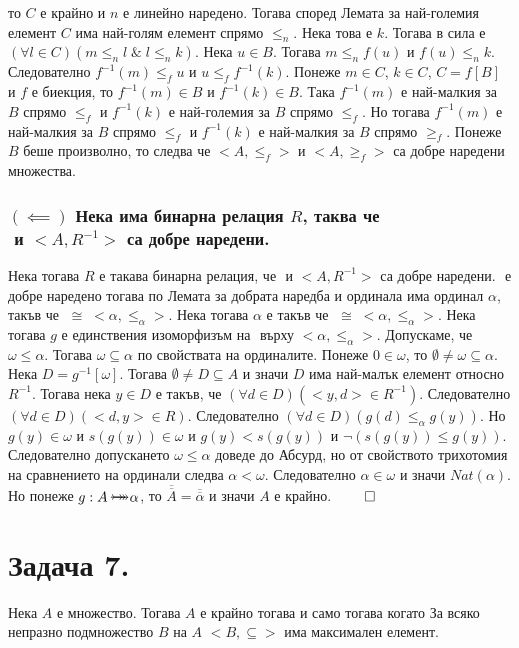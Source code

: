 \documentclass[12pt]{article}
\newcommand{\bijection}[0]{\mathbin{\mathlarger{\mathlarger{\rightarrowtail}} \hspace{-14pt} \mathlarger{\mathlarger{\twoheadrightarrow}}}}
\begin{document}
то \(C\) е крайно и \(n\) е линейно наредено.
Тогава според Лемата за най-големия елемент \(C\) има най-голям елемент спрямо \(\leq_n\).
Нека това е \(k\).
Тогава в сила е \((\forall l \in C)(m \leq_n l \; \& \; l \leq_n k)\).
Нека \(u \in B\). Тогава \(m \leq_n f(u)\) и \(f(u) \leq_n k\).
Следователно \(f^{-1}(m) \leq_f u\) и \(u \leq_f f^{-1}(k)\).
Понеже \(m \in C\), \(k \in C\), \(C = f[B]\) и \(f\) е биекция,
то \(f^{-1}(m) \in B\) и \(f^{-1}(k) \in B\).
Така \(f^{-1}(m)\) е най-малкия за \(B\) спрямо \(\leq_f\)
и \(f^{-1}(k)\) е най-големия за \(B\) спрямо \(\leq_f\).
Но тогава \(f^{-1}(m)\) е най-малкия за \(B\) спрямо \(\leq_f\)
и \(f^{-1}(k)\) е най-малкия за \(B\) спрямо \(\geq_f\).
Понеже \(B\) беше произволно, то следва че
\(<A, \leq_f>\) и \(<A, \geq_f>\) са добре наредени множества.

\subsubsection*{\((\impliedby)\) Нека има бинарна релация \(R\), таква че \\ \(<A, R>\) и \(<A, R^{-1}>\) са добре наредени.}
Нека тогава \(R\) е такава бинарна релация, че \(<A, R>\) и \(<A, R^{-1}>\) са добре наредени. \(<A, R>\) е добре наредено тогава по Лемата за добрата наредба и ординала
има ординал \(\alpha\), такъв че \(<A, R> \; \cong \; <\alpha, \leq_\alpha>\).
Нека тогава \(\alpha\) е такъв че \(<A, R> \; \cong \; <\alpha, \leq_\alpha>\).
Нека тогава \(g\) е единствения изоморфизъм на \(<A, R>\) върху \(<\alpha, \leq_\alpha>\).
Допускаме, че \(\omega \leq \alpha\).
Тогава \(\omega \subseteq \alpha\) по свойствата на ординалите.
Понеже \(0 \in \omega\), то \(\emptyset \neq \omega \subseteq \alpha\).
Нека \(D = g^{-1}[\omega]\). Тогава \(\emptyset \neq D \subseteq A\) и значи
\(D\) има най-малък елемент относно \(R^{-1}\).
Тогава нека \(y \in D\) е такъв, че \((\forall d \in D)(<y, d> \in R^{-1})\).
Следователно \((\forall d \in D)(<d, y> \in R)\).
Следователно \((\forall d \in D)(g(d) \leq_\alpha g(y))\).
Но \(g(y) \in \omega\) и \(s(g(y)) \in \omega\) и \(g(y) < s(g(y))\) и \(\lnot(s(g(y)) \leq g(y))\).
Следователно допускането \(\omega \leq \alpha\) доведе до Абсурд,
но от свойството трихотомия на сравнението на ординали следва \(\alpha < \omega\).
Следователно \(\alpha \in \omega\) и значи \(Nat(\alpha)\).
Но понеже \(g : A \bijection \alpha\), то \(\overline{\overline{A}} = \overline{\overline{\alpha}}\) и значи \(A\) е крайно. \(\qed\)

\section*{Задача 7.}
Нека \(A\) е множество. Тогава \(A\) е крайно тогава и само тогава когато
За всяко непразно подмножество \(B\) на \(A\) \(<B, \subseteq>\) има максимален елемент.
\end{document}
